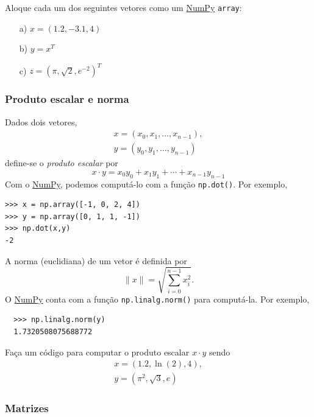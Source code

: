 \documentclass[12pt]{article}
\begin{document}
\begin{exr}
  Aloque cada um dos seguintes vetores como um \href{https://numpy.org/}{NumPy} \lstinline+array+:
  \begin{enumerate}
  \item[a)] $x = (1.2, -3.1, 4)$
  \item[b)] $y = x^T$
  \item[c)] $z = (\pi, \sqrt{2}, e^{-2})^T$
  \end{enumerate}
\end{exr}

\subsubsection{Produto escalar e norma}

Dados dois vetores,
\begin{gather}
  x = (x_0, x_1, \dotsc, x_{n-1}),\\
  y = (y_0, y_1, \dotsc, y_{n-1})
\end{gather}
define-se o \emph{produto escalar} por
\begin{equation}
  x\cdot y = x_0y_0 + x_1y_1 + \cdots + x_{n-1}y_{n-1}
\end{equation}
Com o \href{https://numpy.org/}{NumPy}, podemos computá-lo com a função \lstinline+np.dot()+. Por exemplo,
\begin{lstlisting}
>>> x = np.array([-1, 0, 2, 4])
>>> y = np.array([0, 1, 1, -1])
>>> np.dot(x,y)
-2
\end{lstlisting}

A norma (euclidiana) de um vetor é definida por
\begin{equation}
  \|x\| = \sqrt{\sum_{i=0}^{n-1} x_i^2}.
\end{equation}
O \href{https://numpy.org/}{NumPy} conta com a função \lstinline+np.linalg.norm()+ para computá-la. Por exemplo,
\begin{lstlisting}
  >>> np.linalg.norm(y)
  1.7320508075688772
\end{lstlisting}

\begin{exr}
  Faça um código para computar o produto escalar $x\cdot y$ sendo
  \begin{gather}
    x = (1.2, \ln(2), 4),\\
    y = (\pi^2, \sqrt{3}, e)
  \end{gather}
\end{exr}


\subsubsection{Matrizes}
\end{document}
